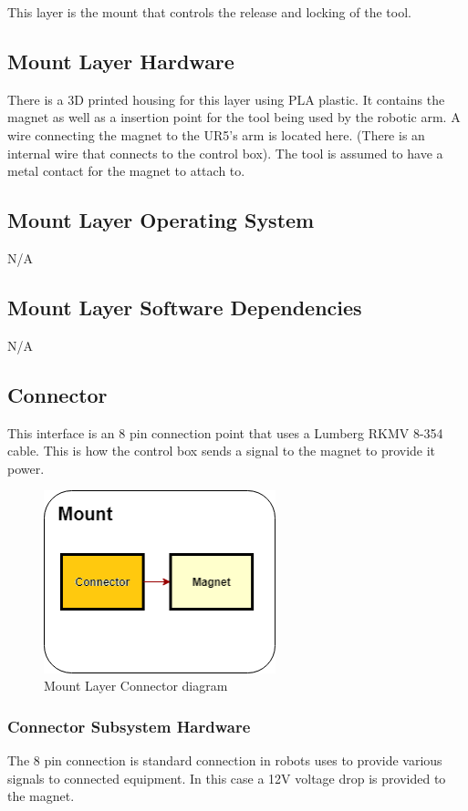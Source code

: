 This layer is the mount that controls the release and locking of the tool.


\subsection{Mount Layer Hardware}
There is a 3D printed housing for this layer using PLA plastic. It contains the magnet as well as a insertion point for the tool being used by the robotic arm.  A wire connecting the magnet to the UR5's arm is located here. (There is an internal wire that connects to the control box). The tool is assumed to have a metal contact for the magnet to attach to.

\subsection{Mount Layer Operating System}
N/A

\subsection{Mount Layer Software Dependencies}
N/A

\subsection{Connector}
This interface is an 8 pin connection point that uses a Lumberg RKMV 8-354 cable.  This is how the control box sends a signal to the magnet to provide it power.

\begin{figure}[h!]
	\centering
 	\includegraphics[width=0.60\textwidth]{images/Mount_Layer_Connector}
 \caption{Mount Layer Connector diagram}
\end{figure}

\subsubsection{Connector Subsystem Hardware}
The 8 pin connection is standard connection in robots uses to provide various signals to connected equipment. In this case a 12V voltage drop is provided to the magnet.

